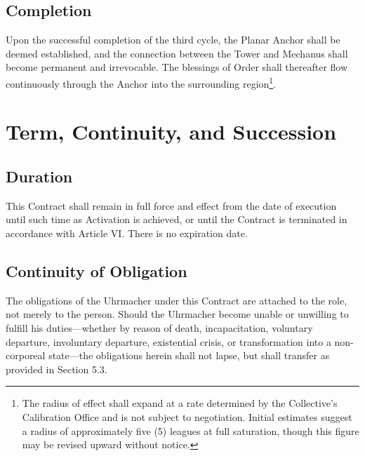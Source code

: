 \documentclass[12pt]{article}
\begin{document}
\subsection{Completion}
Upon the successful completion of the third cycle, the Planar Anchor
shall be deemed established, and the connection between the Tower and
Mechanus shall become permanent and irrevocable. The blessings of
Order shall thereafter flow continuously through the Anchor into the
surrounding region\footnote{The radius of effect shall expand at a
rate determined by the Collective's Calibration Office and is not
subject to negotiation. Initial estimates suggest a radius of
approximately five (5) leagues at full saturation, though this
figure may be revised upward without notice.}.


\section{Term, Continuity, and Succession}

\subsection{Duration}
This Contract shall remain in full force and effect from the date of
execution until such time as Activation is achieved, or until the
Contract is terminated in accordance with Article VI. There is no expiration date.

\subsection{Continuity of Obligation}
The obligations of the Uhrmacher under this Contract are attached to
the role, not merely to the person. Should the Uhrmacher become
unable or unwilling to fulfill his duties---whether by reason of
death, incapacitation, voluntary departure, involuntary departure,
existential crisis, or transformation into a non-corporeal
state---the obligations herein shall not lapse, but shall transfer
as provided in Section 5.3.
\end{document}
